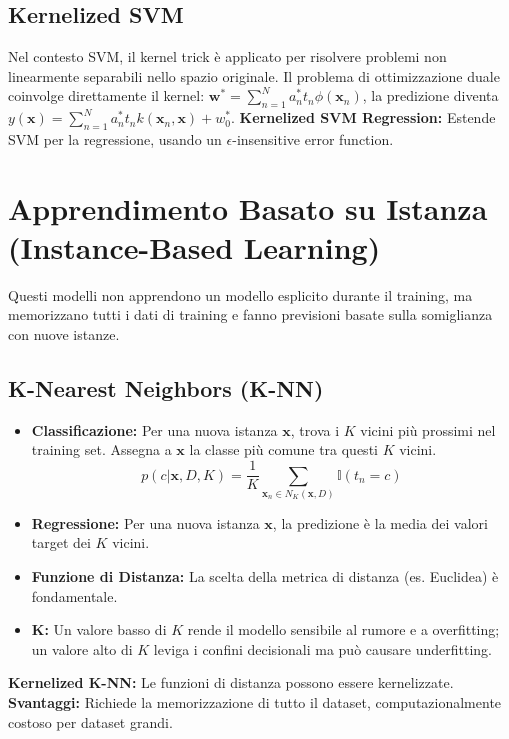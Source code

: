 \documentclass[a4paper,11pt]{article}
\begin{document}
\subsection{Kernelized SVM}
Nel contesto SVM, il kernel trick è applicato per risolvere problemi non linearmente separabili nello spazio originale. Il problema di ottimizzazione duale coinvolge direttamente il kernel:
$\mathbf{w}^* = \sum_{n=1}^N a_n^* t_n \phi(\mathbf{x}_n)$, la predizione diventa $y(\mathbf{x}) = \sum_{n=1}^N a_n^* t_n k(\mathbf{x}_n, \mathbf{x}) + w_0^*$.
\textbf{Kernelized SVM Regression:} Estende SVM per la regressione, usando un $\epsilon$-insensitive error function.

\section{Apprendimento Basato su Istanza (Instance-Based Learning)}

Questi modelli non apprendono un modello esplicito durante il training, ma memorizzano tutti i dati di training e fanno previsioni basate sulla somiglianza con nuove istanze.

\subsection{K-Nearest Neighbors (K-NN)}
\begin{itemize}
    \item \textbf{Classificazione:} Per una nuova istanza $\mathbf{x}$, trova i $K$ vicini più prossimi nel training set. Assegna a $\mathbf{x}$ la classe più comune tra questi $K$ vicini.
    \begin{equation}
        p(c | \mathbf{x}, D, K) = \frac{1}{K} \sum_{\mathbf{x}_n \in N_K(\mathbf{x}, D)} \mathbb{I}(t_n = c)
    \end{equation}
    \item \textbf{Regressione:} Per una nuova istanza $\mathbf{x}$, la predizione è la media dei valori target dei $K$ vicini.
    \item \textbf{Funzione di Distanza:} La scelta della metrica di distanza (es. Euclidea) è fondamentale.
    \item \textbf{K:} Un valore basso di $K$ rende il modello sensibile al rumore e a overfitting; un valore alto di $K$ leviga i confini decisionali ma può causare underfitting.
\end{itemize}
\textbf{Kernelized K-NN:} Le funzioni di distanza possono essere kernelizzate.
\textbf{Svantaggi:} Richiede la memorizzazione di tutto il dataset, computazionalmente costoso per dataset grandi.
\end{document}
